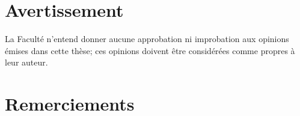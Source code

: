 \section{Avertissement}

La Faculté n’entend donner aucune approbation ni improbation aux opinions émises dans cette thèse; ces opinions doivent être considérées comme propres à leur auteur.

\cleardoublepage

\section{Remerciements}


\cleardoublepage

